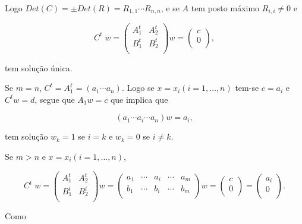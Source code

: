 \noindent Logo $Det(C) = \pm Det(R) = R_{1,1} \cdots R_{n,n}$, e se $A$ tem
posto máximo $R_{i,i} \neq 0$ e

$$
C^t \; w = \left(
\begin{array}{ll}
A^t_1 & A^t_2 \\
B^t_1 & B^t_2 \\
\end{array} \right)
w =
\left(
\begin{array}{l}
c \\
0 \\
\end{array} \right),
$$

\noindent tem solução única.

Se $m = n$, $C^t = A^t_1 = \left( a_1 \cdots a_n \right)$. Logo se $x = x_i (i
= 1,\ldots,n)$ tem-se $c = a_i$ e $C^t  w = d$, segue que $A_1 w = c$ que
implica que

$$
\left( a_1 \cdots a_i \cdots a_n \right) w = a_i,
$$

\noindent tem solução $w_k = 1$ se $i = k$ e $w_k = 0$ se $i \neq k$.

Se $m > n$ e $x = x_i (i = 1,\ldots,n)$,

$$
C^t \; w = \left(
\begin{array}{ll}
A^t_1 & A^t_2 \\
B^t_1 & B^t_2 \\
\end{array} \right)
w =
\left(
\begin{array}{ccccc}
a_1 & \cdots & a_i & \cdots & a_m \\
b_1 & \cdots & b_i & \cdots & b_m \\
\end{array} \right)
w =
\left(
\begin{array}{l}
c \\
0 \\
\end{array} \right)
=
\left(
\begin{array}{l}
a_i \\
0 \\
\end{array} \right).
$$

\noindent Como

